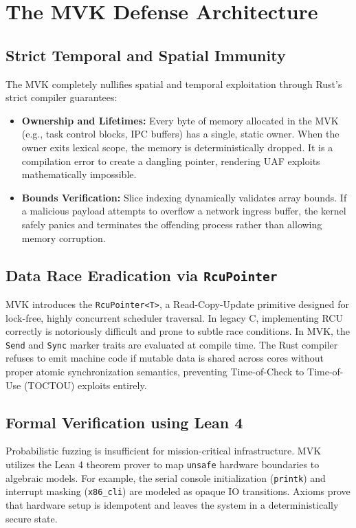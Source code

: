 \documentclass[conference]{IEEEtran}
\begin{document}
\section{The MVK Defense Architecture}

\subsection{Strict Temporal and Spatial Immunity}
The MVK completely nullifies spatial and temporal exploitation through Rust's strict compiler guarantees:
\begin{itemize}
    \item \textbf{Ownership and Lifetimes:} Every byte of memory allocated in the MVK (e.g., task control blocks, IPC buffers) has a single, static owner. When the owner exits lexical scope, the memory is deterministically dropped. It is a compilation error to create a dangling pointer, rendering UAF exploits mathematically impossible.
    \item \textbf{Bounds Verification:} Slice indexing dynamically validates array bounds. If a malicious payload attempts to overflow a network ingress buffer, the kernel safely panics and terminates the offending process rather than allowing memory corruption.
\end{itemize}

\subsection{Data Race Eradication via \texttt{RcuPointer}}
MVK introduces the \texttt{RcuPointer<T>}, a Read-Copy-Update primitive designed for lock-free, highly concurrent scheduler traversal. In legacy C, implementing RCU correctly is notoriously difficult and prone to subtle race conditions.
In MVK, the \texttt{Send} and \texttt{Sync} marker traits are evaluated at compile time. The Rust compiler refuses to emit machine code if mutable data is shared across cores without proper atomic synchronization semantics, preventing Time-of-Check to Time-of-Use (TOCTOU) exploits entirely.

\subsection{Formal Verification using Lean 4}
Probabilistic fuzzing is insufficient for mission-critical infrastructure. MVK utilizes the Lean 4 theorem prover to map \texttt{unsafe} hardware boundaries to algebraic models.
For example, the serial console initialization (\texttt{printk}) and interrupt masking (\texttt{x86\_cli}) are modeled as opaque IO transitions. Axioms prove that hardware setup is idempotent and leaves the system in a deterministically secure state.
\end{document}
